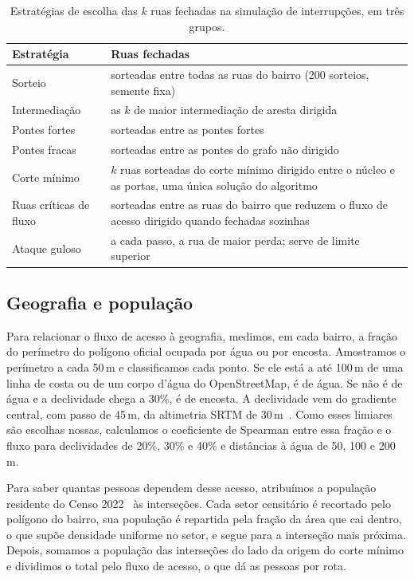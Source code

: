 \begin{table}[tbp]
\centering
\caption{Estratégias de escolha das $k$ ruas fechadas na simulação de
interrupções, em três grupos.}
\label{tab:estrategias}
\begin{tabular}{lp{8.2cm}}
\toprule
Estratégia & Ruas fechadas \\
\midrule
Sorteio & sorteadas entre todas as ruas do bairro (200 sorteios, semente fixa) \\
Intermediação & as $k$ de maior intermediação de aresta dirigida \\
Pontes fortes & sorteadas entre as pontes fortes \\
Pontes fracas & sorteadas entre as pontes do grafo não dirigido \\
\midrule
Corte mínimo & $k$ ruas sorteadas do corte mínimo dirigido entre o núcleo e as portas, uma única solução do algoritmo \\
Ruas críticas de fluxo & sorteadas entre as ruas do bairro que reduzem o fluxo de acesso dirigido
quando fechadas sozinhas \\
\midrule
Ataque guloso & a cada passo, a rua de maior perda; serve de limite superior \\
\bottomrule
\end{tabular}
\end{table}

\subsection{Geografia e população}
\label{sec:geo-pop}

Para relacionar o fluxo de acesso à geografia, medimos, em cada bairro, a
fração do perímetro do polígono oficial ocupada por água ou por encosta.
Amostramos o perímetro a cada 50\,m e classificamos cada ponto. Se ele está a
até 100\,m de uma linha de costa ou de um corpo d'água do OpenStreetMap, é de
água. Se não é de água e a declividade chega a 30\%, é de encosta. A
declividade vem do gradiente central, com passo de 45\,m, da altimetria SRTM
de 30\,m~\cite{opentopodata}. Como esses limiares são escolhas nossas,
calculamos o coeficiente de Spearman entre essa fração e o fluxo para
declividades de 20\%, 30\% e 40\% e distâncias à água de 50, 100 e 200\,m.

Para saber quantas pessoas dependem desse acesso, atribuímos a população
residente do Censo 2022~\cite{ibge2022setores} às interseções. Cada setor
censitário é recortado pelo polígono do bairro, sua população é repartida
pela fração da área que cai dentro, o que supõe densidade uniforme no setor,
e segue para a interseção mais próxima. Depois, somamos a população das
interseções do lado da origem do corte mínimo e dividimos o total pelo fluxo de acesso, o que dá as pessoas por
rota.

